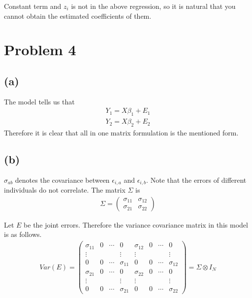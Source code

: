 \documentclass{article}
\begin{document}
Constant term and $z_i$ is not in the above regression, so it is natural that you cannot obtain the estimated coefficients of them.


\section{Problem 4}
\subsection{(a)}
The model tells us that
\begin{align*}
	Y_1 = X\beta_1 + E_1\\
	Y_2 = X\beta_2 + E_2
\end{align*}
Therefore it is clear that all in one matrix formulation is the mentioned form.

\subsection{(b)}
$\sigma_{ab}$ denotes the covariance between $\epsilon_{i,a}$ and $\epsilon_{i, b}$. Note that the errors of different individuals do not correlate. The matrix $\Sigma$ is
\begin{align*}
\Sigma = \begin{pmatrix}
\sigma_{11} & \sigma_{12}\\
\sigma_{21} & \sigma_{22}
\end{pmatrix}
\end{align*}

 Let $E$ be the joint errors. Therefore the variance covariance matrix in this model is as follows.
\begin{align*}
	Var\left(E \right) = \begin{pmatrix}\sigma_{11}& 0& \cdots& 0&\sigma_{12}&0 &\cdots & 0\\
	\vdots&&&\vdots&\vdots&&&\vdots\\
	0&0&\cdots&\sigma_{11}&0&0&\cdots&\sigma_{12}\\
	\sigma_{21}& 0& \cdots& 0&\sigma_{22}&0 &\cdots & 0\\
	\vdots&&&\vdots&\vdots&&&\vdots\\
	0&0&\cdots&\sigma_{21}&0&0&\cdots&\sigma_{22}
	\end{pmatrix}
	=\Sigma \otimes I_N
\end{align*}
\end{document}
